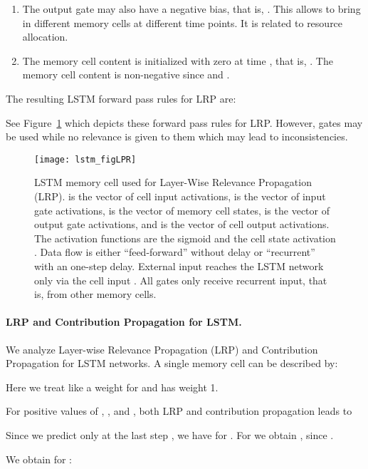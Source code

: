 \documentclass{article}
\begin{document}
\begin{appendices}
\begin{enumerate}[label=\textbf{(A\arabic*)}]
\item The output gate  may also have a negative bias, that is,
  . This allows to bring in different memory cells at
  different time points. It is related to resource allocation.
  
\item The memory cell content is initialized with zero at time ,
  that is, . The memory cell content  
  is non-negative  since 
   and .
 
\end{enumerate}

The resulting LSTM forward pass rules for LRP are:

See Figure~\ref{fig:cellLRP} which depicts these  
forward pass rules for LRP. However, gates may be used while no
relevance is given to them which may lead to inconsistencies.


\begin{figure}[htb]
\centering
\texttt{[image: lstm\_figLPR]}
\caption{LSTM memory cell used for Layer-Wise Relevance Propagation (LRP). 
 is the vector of cell input
activations,  is the vector of input gate
activations,   is the vector of memory cell states,
 is the vector of output gate
activations, and  is the vector of cell output 
activations. The activation functions are
the sigmoid 
and the cell state activation . 
Data flow is either ``feed-forward''
without delay or ``recurrent'' with an one-step delay.
External input reaches the LSTM network 
only via the cell input . All gates only receive
recurrent input, that is, from other memory cells.
\label{fig:cellLRP}}
\end{figure}



\paragraph{LRP and Contribution Propagation for LSTM.}

We analyze Layer-wise Relevance Propagation (LRP) and Contribution Propagation
for LSTM networks.
A single memory cell can be described by:

Here we treat  like a weight for  and  has weight 1.


For positive values of ,  , and ,
both LRP and contribution propagation leads to

Since we predict only at the last step , we have
 for . For  we obtain , since
.

We obtain for :


\end{appendices}
\end{document}
